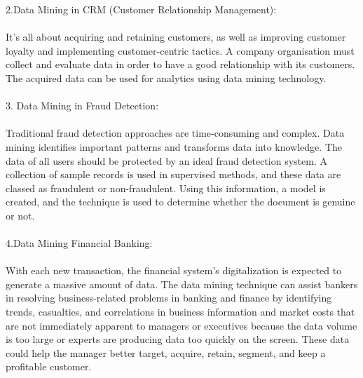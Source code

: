 \documentclass[12pt,letterpaper]{article}
\begin{document}
2.Data Mining in CRM (Customer Relationship Management):\\
\\
It's all about acquiring and retaining customers, as well as improving customer loyalty and implementing customer-centric tactics. A company organisation must collect and evaluate data in order to have a good relationship with its customers. The acquired data can be used for analytics using data mining technology.\\
\\
3. Data Mining in Fraud Detection:\\
\\
Traditional fraud detection approaches are time-consuming and complex. Data mining identifies important patterns and transforms data into knowledge. The data of all users should be protected by an ideal fraud detection system. A collection of sample records is used in supervised methods, and these data are classed as fraudulent or non-fraudulent. Using this information, a model is created, and the technique is used to determine whether the document is genuine or not.\\
\\
4.Data Mining Financial Banking:\\
\\
With each new transaction, the financial system's digitalization is expected to generate a massive amount of data. The data mining technique can assist bankers in resolving business-related problems in banking and finance by identifying trends, casualties, and correlations in business information and market costs that are not immediately apparent to managers or executives because the data volume is too large or experts are producing data too quickly on the screen. These data could help the manager better target, acquire, retain, segment, and keep a profitable customer.\\
\\
\end{document}
